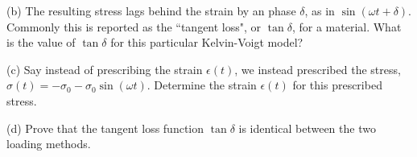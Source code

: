 \medskip
(b) The resulting stress lags behind the strain by an phase $\delta$, as in $\sin(\omega t + \delta)$. 
Commonly this is reported as the ``tangent loss", or $\tan\delta$, for a material. 
What is the value of $\tan\delta$ for this particular Kelvin-Voigt model?

\medskip
(c) Say instead of prescribing the strain $\epsilon(t)$, we instead prescribed the stress, $\sigma(t) = - \sigma_0 - \sigma_0 \sin(\omega t)$. 
Determine the strain $\epsilon(t)$ for this prescribed stress.

\medskip
(d) Prove that the tangent loss function $\tan\delta$ is identical between the two loading methods.





